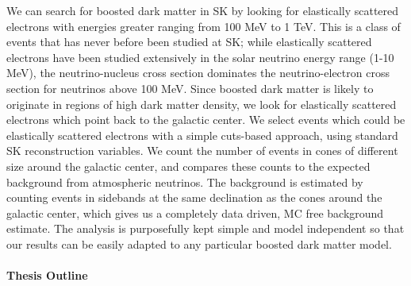 \documentclass[12pt,oneside,openright]{article}
\begin{document}
We can search for boosted dark matter in SK by looking for elastically scattered electrons with energies greater ranging from 100 MeV to 1 TeV.  This is a class of events that has never before been studied at SK; while elastically scattered electrons have been studied extensively in the solar neutrino energy range (1-10 MeV), the neutrino-nucleus cross section dominates the neutrino-electron cross section for neutrinos above 100 MeV.  Since boosted dark matter is likely to originate in regions of high dark matter density, we look for elastically scattered electrons which point back to the galactic center.  We select events which could be elastically scattered electrons with a simple cuts-based approach, using standard SK reconstruction variables.  We count the number of events in cones of different size around the galactic center, and compares these counts to the expected background from atmospheric neutrinos.  The background is estimated by counting events in sidebands at the same declination as the cones around the galactic center, which gives us a completely data driven, MC free background estimate.  The analysis is purposefully kept simple and model independent so that our results can be easily adapted to any particular boosted dark matter model.
\\
\\
\bf{Thesis Outline}
\end{document}
